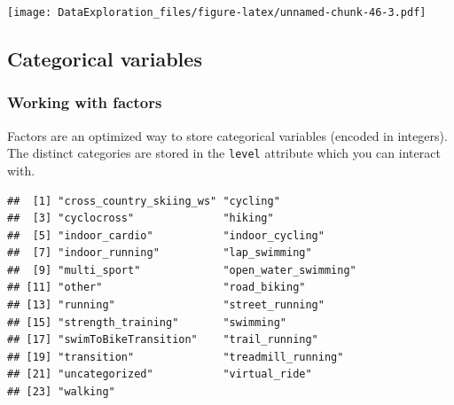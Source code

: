 \documentclass[
]{book}
\newenvironment{Shaded}{\begin{snugshade}}{\end{snugshade}}
\newcommand{\KeywordTok}[1]{\textcolor[rgb]{0.13,0.29,0.53}{\textbf{#1}}}
\newcommand{\NormalTok}[1]{#1}
\newcommand{\OperatorTok}[1]{\textcolor[rgb]{0.81,0.36,0.00}{\textbf{#1}}}
\newcommand{\StringTok}[1]{\textcolor[rgb]{0.31,0.60,0.02}{#1}}
\begin{document}
\texttt{[image: DataExploration\_files/figure-latex/unnamed-chunk-46-3.pdf]}

\hypertarget{categorical-variables}{%
\subsection{Categorical variables}\label{categorical-variables}}

\hypertarget{working-with-factors}{%
\subsubsection{Working with factors}\label{working-with-factors}}

Factors are an optimized way to store categorical variables (encoded in integers). The distinct categories are stored in the \texttt{level} attribute which you can interact with.

\begin{Shaded}
\end{Shaded}

\begin{verbatim}
##  [1] "cross_country_skiing_ws" "cycling"                
##  [3] "cyclocross"              "hiking"                 
##  [5] "indoor_cardio"           "indoor_cycling"         
##  [7] "indoor_running"          "lap_swimming"           
##  [9] "multi_sport"             "open_water_swimming"    
## [11] "other"                   "road_biking"            
## [13] "running"                 "street_running"         
## [15] "strength_training"       "swimming"               
## [17] "swimToBikeTransition"    "trail_running"          
## [19] "transition"              "treadmill_running"      
## [21] "uncategorized"           "virtual_ride"           
## [23] "walking"
\end{verbatim}

\begin{Shaded}
\end{Shaded}
\end{document}
